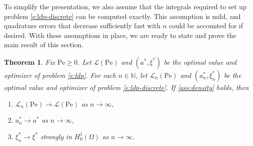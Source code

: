 \documentclass[a4paper, 10pt]{amsart}
\numberwithin{equation}{section}
\theoremstyle{plain}
\newtheorem{theorem}{Theorem}[section]
\theoremstyle{definition}
\theoremstyle{remark}
\newcommand{\N}{\mathbb{N}}
\newcommand{\Pe}{\mathrm{Pe}}
\newcommand{\Hoz}{H_0^1(\Omega)}
\newcommand{\lb}{\mathcal{L}}
\begin{document}
To simplify the presentation, we also assume that the integrals required to set up problem \cref{e:ldp-discrete} can be computed exactly. This assumption is mild, and quadrature errors that decrease sufficiently fast with $n$ could be accounted for if desired. With these assumptions in place, we are ready to state and prove the main result of this section.

\begin{theorem}\label{thm:convergence}
   Fix $\Pe\geq 0$. Let $\lb(\Pe)$ and $(a^*,\xi^*)$ be the optimal value and optimizer of problem \cref{e:ldp}. For each $n\in \N$, let $\lb_n(\Pe)$ and $(a^*_n,\xi^*_n)$ be the optimal value and optimizer of problem \cref{e:ldp-discrete}. If \cref{ass:density} holds, then 
   \begin{enumerate}[{\rm a)}, noitemsep, widest={a)}, leftmargin=*]
       \item\label{item:L-conv}  $\lb_n(\Pe) \to \lb(\Pe)$ as $n\to\infty$,
       \item\label{item:a-conv}  $a_n^* \to a^*$ as $n\to\infty$,
       \item\label{item:xi-conv}  $\xi_n^* \to \xi^*$ strongly in $\Hoz$ as $n\to\infty$.
   \end{enumerate}
\end{theorem}
\end{document}
